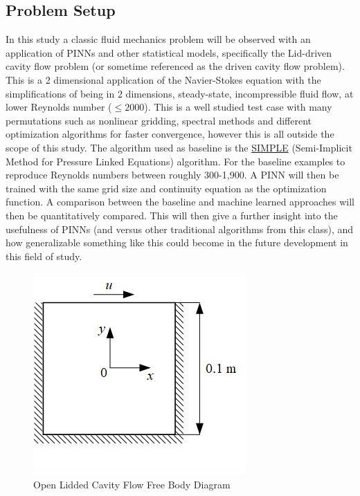 \documentclass{article}
\begin{document}
	\pagebreak
	
	\subsection{Problem Setup}
	
	In this study a classic fluid mechanics problem will be observed with an application of PINNs and other statistical models, specifically the Lid-driven cavity flow problem (or sometime referenced as the driven cavity flow problem). This is a 2 dimensional application of the Navier-Stokes equation with the simplifications of being in 2 dimensions, steady-state, incompressible fluid flow, at lower Reynolds number ($\le 2000$). This is a well studied test case with many permutations such as nonlinear gridding, spectral methods and different optimization algorithms for faster convergence, however this is all outside the scope of this study. The algorithm used as baseline is the \href{https://en.wikipedia.org/wiki/SIMPLE_algorithm}{SIMPLE} (Semi-Implicit Method for Pressure Linked Equations) algorithm. For the baseline examples to reproduce Reynolds numbers between roughly 300-1,900. A PINN will then be trained with the same grid size and continuity equation as the optimization function. A comparison between the baseline and machine learned approaches will then be quantitatively compared. This will then give a further insight into the usefulness of PINNs (and versus other traditional algorithms from this class), and how generalizable something like this could become in the future development in this field of study.
	
	\begin{figure}[ht!]
		\centering
		\includegraphics[scale=0.7]{./images/ldc.png}
		\caption{Open Lidded Cavity Flow Free Body Diagram}
		\label{fig:OLC}
	\end{figure}
	
\end{document}
